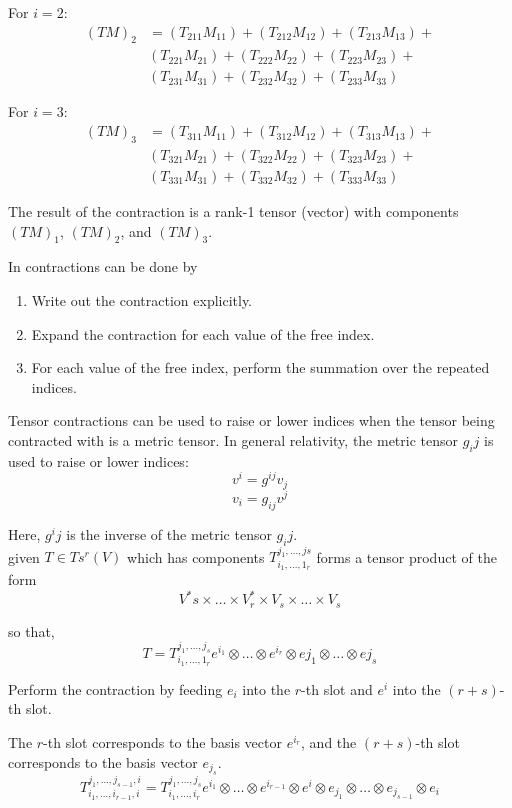 For $i = 2$:
\begin{align*}
(TM)_2 &= (T_{211} M_{11}) + (T_{212} M_{12}) + (T_{213} M_{13}) + \\
        & (T_{221} M_{21}) + (T_{222} M_{22}) + (T_{223} M_{23}) + \\
        & (T_{231} M_{31}) + (T_{232} M_{32}) + (T_{233} M_{33})
\end{align*}

For $i = 3$:
\begin{align*}
(TM)_3 &= (T_{311} M_{11}) + (T_{312} M_{12}) + (T_{313} M_{13}) + \\
        & (T_{321} M_{21}) + (T_{322} M_{22}) + (T_{323} M_{23}) + \\
        & (T_{331} M_{31}) + (T_{332} M_{32}) + (T_{333} M_{33})
\end{align*}

The result of the contraction is a rank-1 tensor (vector) with components $(TM)_1$, $(TM)_2$, and $(TM)_3$.

In contractions can be done by
\begin{enumerate}
\item Write out the contraction explicitly.
\item Expand the contraction for each value of the free index.
\item For each value of the free index, perform the summation over the repeated indices.
\end{enumerate}


Tensor contractions can be used to raise or lower indices when the tensor being contracted with
is a metric tensor.
In general relativity, the metric tensor $g_ij$ is used to raise or lower indices:
$$
v^i = g^{ij} v_j
$$
$$
v_i = g_{ij} v^j
$$

Here, $g^ij$ is the inverse of the metric tensor $g_ij$.
\\


given $T \in T{s}^{r} (V)$ which has components $T_{i_1, \dots , 1_r }^{j_1 , \dots , js}$
forms a tensor product of the form
$$ 
V^{*}{s} \times \dots \times V^{*}_{r} \times V_s \times \dots \times V_s
$$

so that,
$$
T = T_{i_1, \dots , 1_r }^{j_1 , \dots , j_s} e^{i_1} \otimes \dots \otimes e^{i_r} \otimes e{j_1} \otimes \dots \otimes e{j_s}
$$



Perform the contraction by feeding $e_i$ into the $r$-th slot and $e^i$ into the $(r+s)$-th slot.

The $r$-th slot corresponds to the basis vector $e^{i_r}$, and the $(r+s)$-th slot corresponds to the basis vector $e_{j_s}$.
$$
T_{i_1, \dots, i_{r-1}, i}^{j_1, \dots, j_{s-1}, i} =
T_{i_1, \dots, i_r}^{j_1, \dots, j_s} e^{i_1} \otimes \dots \otimes e^{i_{r-1}} \otimes e^i \otimes e_{j_1} \otimes \dots \otimes e_{j_{s-1}} \otimes e_i
$$

